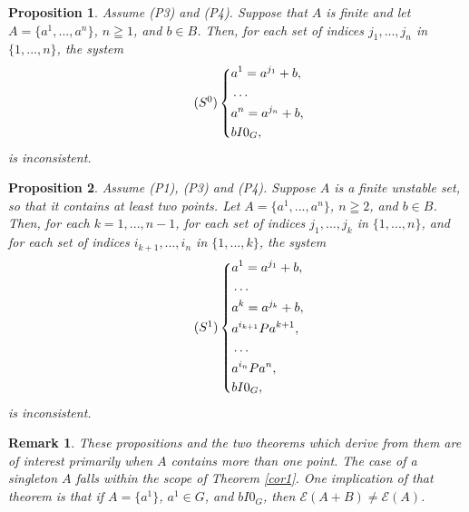 \documentclass[pdflatex,sn-apa,11pt]{sn-jnl}%
\newtheorem{proposition}{Proposition}%
\newtheorem{remark}{Remark}%
\begin{document}
\begin{proposition}
\label{prop1rep}
Assume (P3) and (P4). Suppose that $A$ is finite and let $A = \{a^1, ..., a^n\}$, $n \geqq 1$, and $b \in B$. Then, for each set of indices $j_1, ..., j_n$ in $\{1, ..., n\}$, the system
\begin{equation}
\tag{$S^{0}$}
\label{$S^{0}$}
  \left\{
    \begin{aligned}
      & a^1 = a^{j_1} + b, \\
      & \dots \\
      & a^n = a^{j_n} + b, \\
      & bI{0_G},
    \end{aligned}
  \right.
\end{equation}
is inconsistent.
\end{proposition}

\begin{proposition}
\label{prop1}
Assume (P1), (P3) and (P4). Suppose $A$ is a finite unstable set, so that it contains at least two points. Let $A = \{a^1, ..., a^n\}$, $n \geqq 2$, and $b \in B$. Then, for each $k = 1, ..., n-1$, for each set of indices $j_1, ..., j_k$ in $\{1, ..., n\}$, and for each set of indices $i_{k+1}, ..., i_{n}$ in $\{1, ..., k\}$, the system
\begin{equation}
\tag{$S^{1}$}
\label{$S^{1}$}
  \left\{
    \begin{aligned}
      & a^1 = a^{j_1} + b, \\
      & \dots \\
      & a^k = a^{j_k} + b, \\
      & a^{i_{k+1}}Pa^{k+1}, \\
      & \dots \\
      & a^{i_{n}}Pa^{n}, \\
      & bI{0_G},
    \end{aligned}
  \right.
\end{equation}
is inconsistent.
\end{proposition}

\begin{remark}
These propositions and the two theorems which derive from them are of interest primarily when $A$ contains more than one point. The case of a singleton $A$ falls within the scope of Theorem \ref{cor1}. One implication of that theorem is that if $A = \{a^{1}\}$, $a^{1} \in G$, and $bI0_{G}$, then $\mathscr{E}(A+B) \neq \mathscr{E}(A)$.    
\end{remark}
\end{document}
